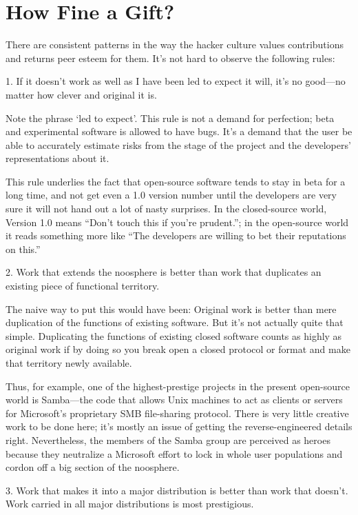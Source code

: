 \section{How Fine a Gift?}

There are consistent patterns in the way the hacker culture values contributions
and returns peer esteem for them.  It's not hard to observe the following rules:

1.  If it doesn't work as well as I have been led to expect it will, it's no
good—no matter how clever and original it is.

Note the phrase `led to expect'.  This rule is not a demand for perfection; beta
and experimental software is allowed to have bugs.  It's a demand that the user
be able to accurately estimate risks from the stage of the project and the
developers' representations about it.

This rule underlies the fact that open-source software tends to stay in beta for
a long time, and not get even a 1.0 version number until the developers are very
sure it will not hand out a lot of nasty surprises.  In the closed-source world,
Version 1.0 means ``Don't touch this if you're prudent.''; in the open-source
world it reads something more like ``The developers are willing to bet their
reputations on this.''

2.  Work that extends the noosphere is better than work that duplicates an
existing piece of functional territory.

The naive way to put this would have been: Original work is better than mere
duplication of the functions of existing software.  But it's not actually quite
that simple.  Duplicating the functions of existing closed software counts as
highly as original work if by doing so you break open a closed protocol or
format and make that territory newly available.

Thus, for example, one of the highest-prestige projects in the present
open-source world is Samba—the code that allows Unix machines to act as clients
or servers for Microsoft's proprietary SMB file-sharing protocol.  There is very
little creative work to be done here; it's mostly an issue of getting the
reverse-engineered details right.  Nevertheless, the members of the Samba group
are perceived as heroes because they neutralize a Microsoft effort to lock in
whole user populations and cordon off a big section of the noosphere.

3.  Work that makes it into a major distribution is better than work that
doesn't.  Work carried in all major distributions is most prestigious.

